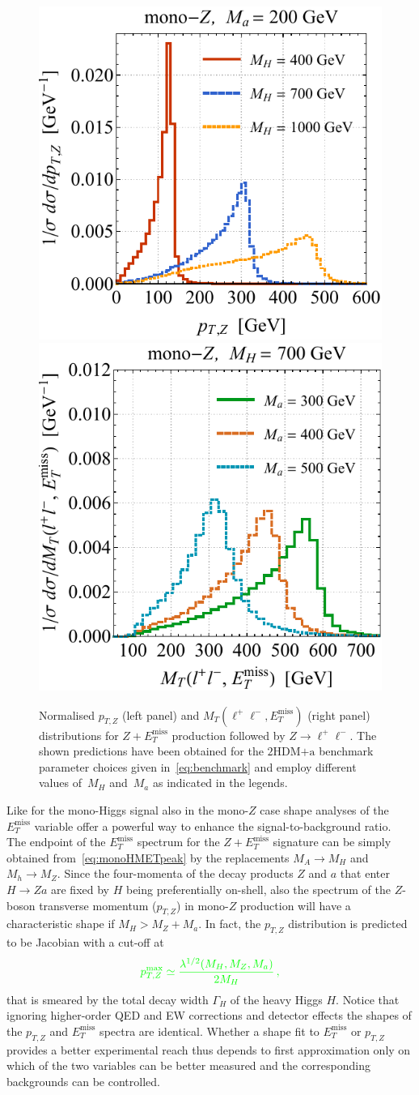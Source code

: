 \documentclass[a4paper, 11pt,notoc]{article}
\newcommand{\MET}{\ensuremath{E_T^\mathrm{miss}}\xspace}
\newcommand{\hdma}{\ensuremath{\textrm{2HDM+a}}\xspace}
\begin{document}
\begin{figure}[t!]
\centering
\includegraphics[height=0.45\textwidth]{ptzspec.pdf}	\qquad 
\includegraphics[height=0.45\textwidth]{mtspec.pdf}
\vspace{2mm}
\caption{\label{fig:zptmt} Normalised $p_{T,Z}$ (left panel) and $M_T (\ell^+ \ell^-, \MET)$ (right panel) distributions for $Z + \MET$ production followed by $Z \to \ell^+ \ell^-$. The shown predictions have been obtained for the \hdma benchmark parameter choices  given in~\eqref{eq:benchmark} and employ different values of~$M_H$ and~$M_a$ as indicated in the legends.}
\end{figure}

Like for the mono-Higgs signal also in the mono-$Z$ case shape analyses of the~$\MET$ variable offer a powerful way to enhance the {\color{green} signal-to-background} ratio. The endpoint of the $\MET$ spectrum for the $Z+\MET$ signature can be simply obtained from~\eqref{eq:monoHMETpeak} by the replacements $M_A \to M_H$ and $M_h \to M_Z$.  Since the four-momenta of the decay products $Z$ and $a$ that enter $H \to Za$ are fixed by $H$ being preferentially on-shell, also the spectrum of the $Z$-boson transverse momentum ($p_{T,Z}$) in mono-$Z$ production will have a characteristic shape if $M_H > M_Z + M_a$.  {\color{magenta} In fact,  the $p_{T,Z}$ distribution is predicted  to be Jacobian with a cut-off at~\cite{No:2015xqa,Bauer:2017ota}}
\begin{equation} \label{eq:monoZpTpeak}
\color{green} p_{T,Z}^{ {\rm max} } \simeq \frac{\lambda^{1/2}(M_H, M_Z, M_a)}{2 M_H}\,,
\end{equation}
that is smeared by the total decay width $\Gamma_H$ of the heavy Higgs $H$. {\color{magenta} Notice that  ignoring higher-order QED and EW corrections and detector effects the shapes of the $p_{T,Z}$ and $\MET$ spectra are identical. Whether a shape fit to $\MET$ or $p_{T,Z}$ provides a better experimental reach thus depends to first approximation only on which of the two variables can be better measured and the corresponding backgrounds can be controlled.}
\end{document}
